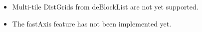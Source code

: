 
\begin{itemize}
\item Multi-tile DistGrids from deBlockList are not yet supported.
\item The fastAxis feature has not been implemented yet.
\end{itemize}

